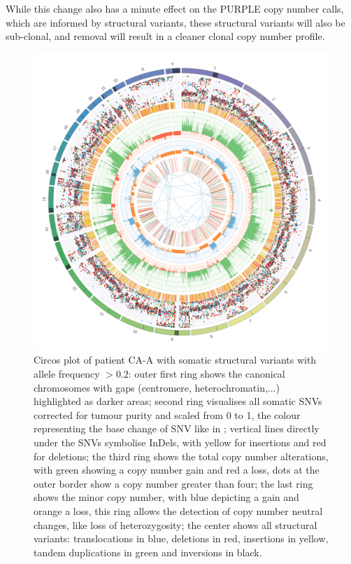 While this change also has a minute effect on the PURPLE copy number calls, which are informed by structural variants, these structural variants will also be sub-clonal, and  removal will result in a cleaner clonal copy number profile.

\begin{figure}[htp]
\centering
\includegraphics[width=.99\linewidth]{Figures/CASCADE/CA99/CA99-11.circos.png}
\caption[Circos plot of patient CA-A sample 11]{Circos plot of patient CA-A with somatic structural variants with allele frequency $> 0.2$: outer first ring shows the canonical chromosomes with gaps (centromere, heterochromatin,...) highlighted as darker areas; second ring visualises all somatic SNVs corrected for tumour purity and scaled from 0 to 1, the colour representing the base change of SNV like in \protect\textcite{Alexandrov2013}; vertical lines directly under the SNVs symbolise InDels, with yellow for insertions and red for deletions; the third ring shows the total copy number alterations, with green showing a copy number gain and red a loss, dots at the outer border show a copy number greater than four; the last ring shows the minor copy number, with blue depicting a gain and orange a loss, this ring allows the detection of copy number neutral changes, like loss of heterozygosity; the center shows all structural variants: translocations in blue, deletions in red, insertions in yellow, tandem duplications in green and inversions in black.} \label{fig:ca99.11circos}
\end{figure}


